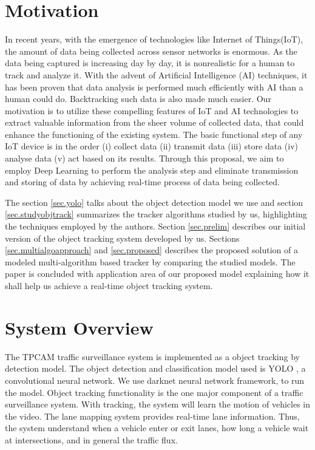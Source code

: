 \documentclass[conference]{IEEEtran}
\begin{document}
\section{Motivation}
In recent years, with the emergence of technologies like Internet of Things(IoT), the amount of data being collected across sensor networks is enormous. 
As the data being captured is increasing day by day, it is nonrealistic for a human to track and analyze it. 
With the advent of Artificial Intelligence ({AI}) techniques, it has been proven that data analysis is performed much efficiently with AI than a human could do. 
Backtracking such data is also made much easier. Our motivation is to utilize these compelling features of  IoT and AI technologies to extract valuable information from the sheer volume of collected data, that could enhance the functioning of the existing system. 
The basic functional step of any IoT device is in the order (i) collect data (ii) transmit data (iii) store data (iv) analyse data  (v) act based on its results. 
Through this proposal, we aim to employ Deep Learning to perform the analysis step and eliminate transmission and storing of data by achieving real-time process of data being collected.\par
The section \ref{sec.yolo} talks about the object detection model we use and section \ref{sec.studyobjtrack} summarizes the tracker algorithms studied by us, highlighting the techniques employed by the authors. 
Section \ref{sec.prelim} describes our initial version of the object tracking system developed by us. 
Sections \ref{sec.multialgoapproach} and \ref{sec.proposed} describes the proposed solution of a modeled multi-algorithm based tracker by comparing the studied models. 
The paper is concluded with application area of our proposed model explaining how it shall help us achieve a real-time object tracking system. 



\section{System Overview}\label{sec.overview}
The TPCAM traffic surveillance system is implemented as a object tracking by detection model.
The object detection and classification model used is YOLO \cite{YOLO_v1, YOLO_v2}, a convolutional neural network. 
We use darknet \cite{darknet} neural network framework, to run the model.
Object tracking functionality is the one major component of a traffic surveillance system.
With tracking, the system will learn the motion of vehicles in the video.
The lane mapping system provides real-time lane information.
Thus, the system understand when a vehicle enter or exit lanes, how long a vehicle wait at intersections, and in general the traffic flux.
\end{document}
